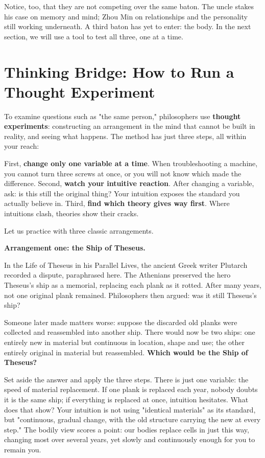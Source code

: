 Notice, too, that they are not competing over the same baton. The uncle stakes his case on memory and mind; Zhou Min on relationships and the personality still working underneath. A third baton has yet to enter: the body. In the next section, we will use a tool to test all three, one at a time.

\section[Thinking Tool: Thought Experiments]{Thinking Bridge: How to Run a Thought Experiment}
To examine questions such as "the same person," philosophers use \textbf{thought experiments}: constructing an arrangement in the mind that cannot be built in reality, and seeing what happens. The method has just three steps, all within your reach:

First, \textbf{change only one variable at a time}. When troubleshooting a machine, you cannot turn three screws at once, or you will not know which made the difference. Second, \textbf{watch your intuitive reaction}. After changing a variable, ask: is this still the original thing? Your intuition exposes the standard you actually believe in. Third, \textbf{find which theory gives way first}. Where intuitions clash, theories show their cracks.

Let us practice with three classic arrangements.

\textbf{Arrangement one: the Ship of Theseus.}

In the Life of Theseus in his Parallel Lives, the ancient Greek writer Plutarch recorded a dispute, paraphrased here. The Athenians preserved the hero Theseus's ship as a memorial, replacing each plank as it rotted. After many years, not one original plank remained. Philosophers then argued: was it still Theseus's ship?

Someone later made matters worse: suppose the discarded old planks were collected and reassembled into another ship. There would now be two ships: one entirely new in material but continuous in location, shape and use; the other entirely original in material but reassembled. \textbf{Which would be the Ship of Theseus?}

Set aside the answer and apply the three steps. There is just one variable: the speed of material replacement. If one plank is replaced each year, nobody doubts it is the same ship; if everything is replaced at once, intuition hesitates. What does that show? Your intuition is not using "identical materials" as its standard, but "continuous, gradual change, with the old structure carrying the new at every step." The bodily view scores a point: our bodies replace cells in just this way, changing most over several years, yet slowly and continuously enough for you to remain you.

